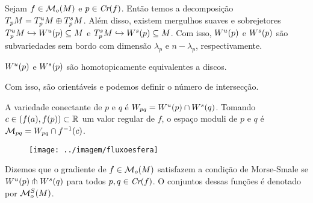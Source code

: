 \documentclass{beamer}
\begin{document}
	\begin{frame}
		
		\begin{teorema}
			Sejam $f \in \mathcal{M}_{o}(M)$ e $p \in \textit{Cr}(f)$. Então temos a decomposição $T_{p}M=T^{u}_{p}M\oplus T^{s}_{p}M$. Além disso, existem mergulhos suaves e sobrejetores $T^{u}_{p}M \hookrightarrow W^{u}(p) \subseteq M$ e $T^{s}_{p}M \hookrightarrow W^{s}(p) \subseteq M$. Com isso, $W^{u}(p)$ e $W^{s}(p)$ são subvariedades sem bordo com dimensão $\lambda_{p}$ e $n-\lambda_{p}$, respectivamente.
		\end{teorema}
	
		\begin{observacao}
			$W^{u}(p)$ e $W^{s}(p)$ são homotopicamente equivalentes a discos.
		\end{observacao}
		
		\begin{tiny}
			Com isso, são orientáveis e podemos definir o número de intersecção.
		\end{tiny}
	\end{frame}
	
	\begin{frame}
		
		\begin{definicao}
			A variedade conectante de $p$ e $q$ é $W_{pq} = W^{u}(p)\cap W^{s}(q)$. Tomando $c \in (f(a), f(p)) \subset \mathbb{R}^{}$ um valor regular de $f$, o espaço moduli de $p$ e $q$ é $\mathcal{M}_{pq} = W_{pq}\cap f^{-1}(c)$.
		\end{definicao}
		
		\begin{figure}
			\centering
			\textbf{}\par
			\texttt{[image: ../imagem/fluxoesfera]}
		\end{figure}
		
		\begin{definicao}
			Dizemos que o gradiente de $f \in \mathcal{M}_{o}(M)$ satisfazem a condição de Morse-Smale se $W^{u}(p)\pitchfork W^{s}(q)$ para todos $p,q \in \textit{Cr}(f)$. O conjuntos dessas funções é denotado por $\mathcal{M}^{S}_{o}(M)$.
		\end{definicao}
	
	\end{frame}
	
\end{document}

